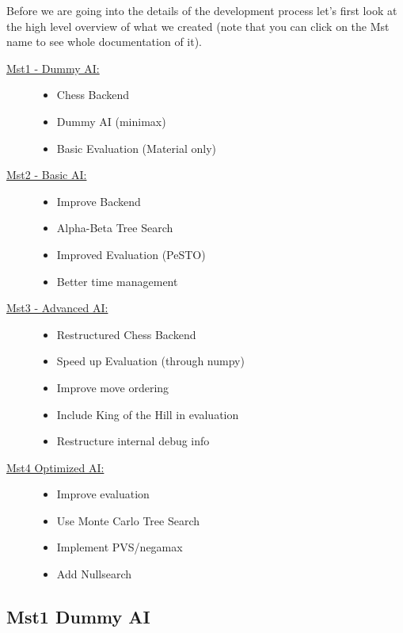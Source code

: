 Before we are going into the details of the
development process let's first look at
the high level overview of what we created
(note that you can click on the Mst name to see
whole documentation of it).

\begin{description}
  \item[\href{https://github.com/PraxTube/chess-ai/tree/master/docs/milestones/1-dummy-AI}{Mst1 - Dummy AI:}] \hfill
    \begin{itemize}
      \item Chess Backend
      \item Dummy AI (minimax)
      \item Basic Evaluation (Material only)
    \end{itemize}
  \item[\href{https://github.com/PraxTube/chess-ai/tree/master/docs/milestones/2-basic-AI}{Mst2 - Basic AI:}] \hfill
    \begin{itemize}
      \item Improve Backend
      \item Alpha-Beta Tree Search
      \item Improved Evaluation (PeSTO)
      \item Better time management
    \end{itemize}
  \item[\href{https://github.com/PraxTube/chess-ai/tree/master/docs/milestones/3-advanced-AI}{Mst3 - Advanced AI:}] \hfill
    \begin{itemize}
      \item Restructured Chess Backend
      \item Speed up Evaluation (through numpy)
      \item Improve move ordering
      \item Include King of the Hill in evaluation
      \item Restructure internal debug info
    \end{itemize}
  \item[\href{https://github.com/PraxTube/chess-ai/blob/documentation-milestone-four/docs/milestones/4-optimized-AI/README.md}{Mst4 Optimized AI:}] \hfill
    \begin{itemize}
      \item Improve evaluation
      \item Use Monte Carlo Tree Search
      \item Implement PVS/negamax
      \item Add Nullsearch
    \end{itemize}
\end{description}

\pagebreak

\subsection{Mst1 Dummy AI}


